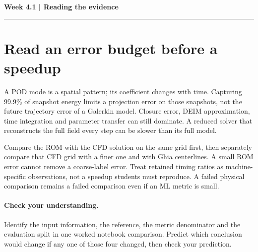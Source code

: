 \documentclass[11pt]{article}
\begin{document}
\noindent\textbf{Week 4.1 | Reading the evidence}\par\medskip\hrule\medskip
\section*{Read an error budget before a speedup}
A POD mode is a spatial pattern; its coefficient changes with time. Capturing
99.9\% of snapshot energy limits a projection error on those snapshots, not the
future trajectory error of a Galerkin model. Closure error, DEIM approximation,
time integration and parameter transfer can still dominate. A reduced solver
that reconstructs the full field every step can be slower than its full model.

Compare the ROM with the CFD solution on the same grid first, then separately
compare that CFD grid with a finer one and with Ghia centerlines. A small ROM
error cannot remove a coarse-label error. Treat retained timing ratios as
machine-specific observations, not a speedup students must reproduce. A failed
physical comparison remains a failed comparison even if an ML metric is small.
\paragraph{Check your understanding.}
Identify the input information, the reference, the metric denominator and the
evaluation split in one worked notebook comparison. Predict which conclusion
would change if any one of those four changed, then check your prediction.
\end{document}
